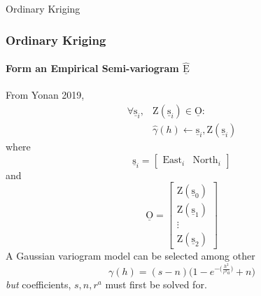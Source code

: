 \documentclass[professionalfont,10pt]{beamer}
\begin{document}
	\begin{frame}[t]{Ordinary Kriging}
		\frametitle{Ordinary Kriging}
		\framesubtitle{Form an Empirical Semi-variogram $\hat{\underline{\text{E}}}$}
		\hskip-0.75cm
		\begin{minipage}[t]{0.2\linewidth}\vspace{-0.5cm}
			\tiny\tableofcontents[currentsection,currentsubsection,hideothersubsections,subsectionstyle=show/shaded]
		\end{minipage}
		\hfill%
		\begin{minipage}[t]{0.86\linewidth}\vspace{-0.5cm}
			From Yonan 2019,
			\begin{align*}
				\forall \underline{\text{s}}_i,& \text{Z}(\underline{\text{s}}_i) \in \underline{\text{O}}:\\
				& \hat{\gamma}(h) \leftarrow \underline{\text{s}}_i, \text{Z}(\underline{\text{s}}_i)
			\end{align*}
			where 
			\begin{equation*}
				\underline{\text{s}}_i = 
				\left[\begin{array}{cc}
					\text{East}_i & \text{North}_i
				\end{array}\right]
			\end{equation*}
			and
			\begin{equation}\label{}
			\underline{\text{O}}
			=
			\left[\begin{array}{c}
				\text{Z}(\underline{\text{s}}_0)\\
				\text{Z}(\underline{\text{s}}_1)\\
				\vdots\\
				\text{Z}(\underline{\text{s}}_2)
				\end{array}\right]
			\end{equation}
			A Gaussian variogram model can be selected among other
			\begin{equation}\label{eq:GaussianModelVariogram}
				\gamma(h) = (s-n)\bigg(1-e^{-\big(\frac{h^2}{r^2a}\big)} + n\bigg)
			\end{equation}
			\textit{but} coefficients, $s, n, r^a$ must first be solved for.
		\end{minipage}
		\vfill%
	\end{frame}
\end{document}
